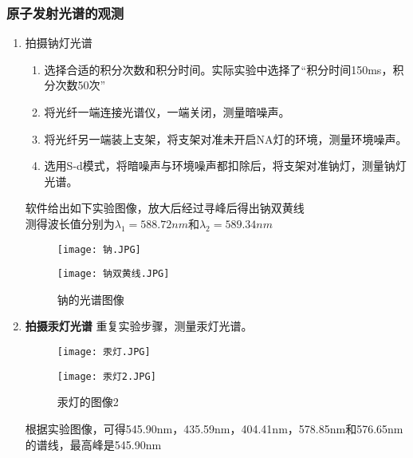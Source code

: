 \documentclass[dvipsnames, svgnames,a4paper,11pt]{article}
\begin{document}
	\subsubsection{原子发射光谱的观测}
	\begin{enumerate}
		\item 拍摄钠灯光谱
		\begin{enumerate}
			\item 选择合适的积分次数和积分时间。实际实验中选择了“积分时间150ms，积分次数50次”
			
			\item 将光纤一端连接光谱仪，一端关闭，测量暗噪声。 
			
			\item 将光纤另一端装上支架，将支架对准未开启NA灯的环境，测量环境噪声。
			
			\item 选用S-d模式，将暗噪声与环境噪声都扣除后，将支架对准钠灯，测量钠灯光谱。
			
		\end{enumerate}
        软件给出如下实验图像，放大后经过寻峰后得出钠双黄线\\
		测得波长值分别为$\lambda_1=588.72nm$和$\lambda_2=589.34nm$
		\begin{figure}[!htb]
			\centering
			\begin{minipage}{0.35\textwidth}
				\centering
				\texttt{[image: 钠.JPG]}
				
				\label{fig:sodium_spectrum}
			\end{minipage}%
			\hspace{0.1\textwidth}
			\begin{minipage}{0.35\textwidth}
				\centering
				\texttt{[image: 钠双黄线.JPG]}
				
				\label{fig:sodium_double_yellow_lines}
			\end{minipage}
			\caption{钠的光谱图像}
			\label{fig:sodium_spectra}
		\end{figure}
		\item \textbf{拍摄汞灯光谱}
		重复实验步骤，测量汞灯光谱。
		\begin{figure}[H]
			\centering
			\begin{minipage}{0.35\textwidth}
				\centering
				\texttt{[image: 汞灯.JPG]}
			
				\label{fig:mercury_lamp1}
			\end{minipage}%
			\hspace{0.1\textwidth}
			\begin{minipage}{0.35\textwidth}
				\centering
				\texttt{[image: 汞灯2.JPG]}
				
				\label{fig:mercury_lamp2}
			\end{minipage}
		 \caption{汞灯的图像2}
			\label{fig:mercury_lamps}
		\end{figure}
		根据实验图像，可得545.90nm，435.59nm，404.41nm，578.85nm和576.65nm的谱线，最高峰是545.90nm
	\end{enumerate}	
\end{document}
